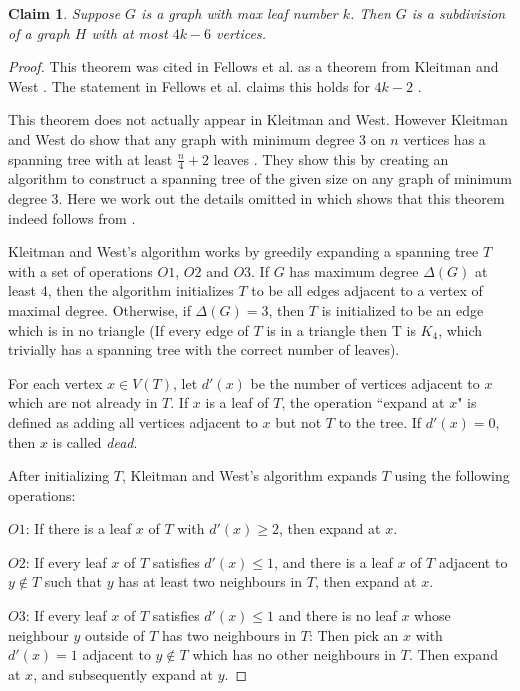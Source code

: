 \documentclass[11pt]{report}
\newtheorem{claim}{Claim}
\begin{document}
\begin{claim} Suppose $G$ is a graph with max leaf number $k$. Then $G$ is a subdivision of a graph $H$ with at most $4k-6$ vertices.
\label{mln_subdiv}
\end{claim}
\begin{proof} This theorem was cited in Fellows et al. \cite{FellowsMnich09} as a theorem from Kleitman and West \cite{KleitmanWest91}. The statement in Fellows et al. claims this holds for $4k-2$ \cite{FellowsMnich09}.

This theorem does not actually appear in Kleitman and West. However Kleitman and West do show that any graph with minimum degree 3 on $n$ vertices has a spanning tree with at least $\frac{n}{4}+2$ leaves \cite{KleitmanWest91}. They show this by creating an algorithm to construct a spanning tree of the given size on any graph of minimum degree 3. Here we work out the details omitted in \cite{FellowsMnich09} which shows that this theorem indeed follows from \cite{KleitmanWest91}.

Kleitman and West's algorithm works by greedily expanding a spanning tree $T$ with a set of operations $O1$, $O2$ and $O3$. If $G$ has maximum degree $\Delta (G)$ at least $4$, then the algorithm initializes $T$ to be all edges adjacent to a vertex of maximal degree. Otherwise, if $\Delta (G) =3$, then $T$ is initialized to be an edge which is in no triangle (If every edge of $T$ is in a triangle then T is $K_4$, which trivially has a spanning tree with the correct number of leaves).

For each vertex $x\in V(T)$, let $d'(x)$ be the number of vertices adjacent to $x$ which are not already in $T$. If $x$ is a leaf of $T$, the operation ``expand at $x$" is defined as adding all vertices adjacent to $x$ but not $T$ to the tree. If $d'(x)=0$, then $x$ is called \emph{dead}.

After initializing $T$, Kleitman and West's algorithm expands $T$ using the following operations:

$O1$: If there is a leaf $x$ of $T$ with $d'(x)\geq 2$, then expand at $x$.

$O2$: If every leaf $x$ of $T$ satisfies $d'(x)\leq 1$, and there is a leaf $x$ of $T$ adjacent to $y\notin T$ such that $y$ has at least two neighbours in $T$, then expand at $x$.


$O3$: If every leaf $x$ of $T$ satisfies $d'(x)\leq 1$ and there is no leaf $x$ whose neighbour $y$ outside of $T$ has two neighbours in $T$: Then pick an $x$ with $d'(x)=1$ adjacent to $y\notin T$ which has no other neighbours in $T$. Then expand at $x$, and subsequently expand at $y$.



\end{proof}
\end{document}
